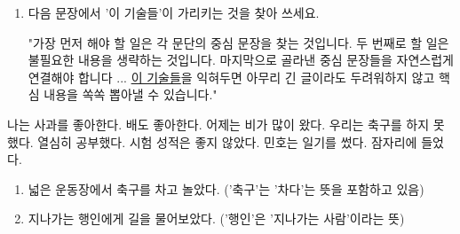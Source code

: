 \documentclass[fs11,seriesFre]{korfarm-base}
\begin{document}
\kfActivityBg {}
\par{}\par\nopagebreak[4]\smallskip\nopagebreak[4]
\begin{enumerate}[leftmargin=22pt, itemsep=6pt, topsep=4pt, label=\textbf{\arabic*.}]
\item 다음 문장에서 '이 기술들'이 가리키는 것을 찾아 쓰세요.
\begin{kfEvidence}"가장 먼저 해야 할 일은 각 문단의 중심 문장을 찾는 것입니다. 두 번째로 할 일은 불필요한 내용을 생략하는 것입니다. 마지막으로 골라낸 중심 문장들을 자연스럽게 연결해야 합니다 ... \uline{이 기술들}을 익혀두면 아무리 긴 글이라도 두려워하지 않고 핵심 내용을 쏙쏙 뽑아낼 수 있습니다."\end{kfEvidence}
\end{enumerate}

\kfActivityBg \par{}\par\nopagebreak[4]\smallskip\nopagebreak[4]
\begin{kfBlankList}
\kfBlankItem 나는 사과를 좋아한다. \kfFillBlank[12mm]{} 배도 좋아한다.
\kfBlankItem 어제는 비가 많이 왔다. \kfFillBlank[12mm]{} 우리는 축구를 하지 못했다.
\kfBlankItem 열심히 공부했다. \kfFillBlank[12mm]{} 시험 성적은 좋지 않았다.
\kfBlankItem 민호는 일기를 썼다. \kfFillBlank[12mm]{} 잠자리에 들었다.
\end{kfBlankList}

\kfActivityBg {}
\par{}\par\nopagebreak[4]\smallskip\nopagebreak[4]
\begin{enumerate}[leftmargin=22pt, itemsep=6pt, topsep=4pt, label=\textbf{\arabic*.}]
\item 넓은 운동장에서 축구를 차고 놀았다. ('축구'는 '차다'는 뜻을 포함하고 있음)
\item 지나가는 행인에게 길을 물어보았다. ('행인'은 '지나가는 사람'이라는 뜻)
\end{enumerate}
\end{document}

